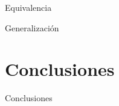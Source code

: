 \documentclass[svgnames,12pt,aspectratio=149]{beamer}
\begin{document}
\begin{frame}{Equivalencia}
    
\end{frame}


\begin{frame}{Generalización}
    
\end{frame}

\section{Conclusiones}

\begin{frame}{Conclusiones}
    
\end{frame}
\end{document}
